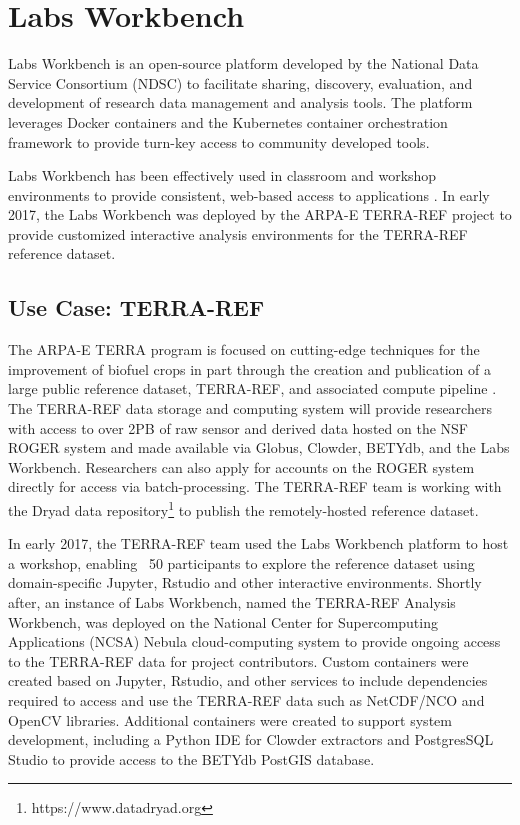 \documentclass{sig-alternate}
\begin{document}
\section{Labs Workbench}

Labs Workbench is an open-source platform developed by the National Data Service Consortium (NDSC) to facilitate sharing, discovery, evaluation, and development of research data management and analysis tools. The platform leverages Docker containers and the Kubernetes container orchestration framework to provide turn-key access to community developed tools. 

Labs Workbench has been effectively used in classroom and workshop environments to provide consistent, web-based access to applications \cite{ndsphenome}. In early 2017, the Labs Workbench was deployed by the ARPA-E TERRA-REF project to provide customized interactive analysis environments for the TERRA-REF reference dataset. 

\subsection{Use Case: TERRA-REF}

The ARPA-E TERRA program is focused on cutting-edge techniques for the improvement of biofuel crops in part through the creation and publication of a large public reference dataset, TERRA-REF, and associated compute pipeline \cite{arpae2015}. The TERRA-REF data storage and computing system will provide researchers with access to over 2PB of raw sensor and derived data hosted on the NSF ROGER system and made available via Globus, Clowder, BETYdb, and the Labs Workbench. Researchers can also apply for accounts on the ROGER system directly for access via batch-processing. The TERRA-REF team is working with the Dryad data repository\footnote{https://www.datadryad.org} to publish the remotely-hosted reference dataset.

In early 2017, the TERRA-REF team used the Labs Workbench platform to host a workshop, enabling ~50 participants to explore the reference dataset using domain-specific Jupyter, Rstudio and other interactive environments. Shortly after, an instance of Labs Workbench, named the TERRA-REF Analysis Workbench, was deployed on the National Center for Supercomputing Applications (NCSA) Nebula cloud-computing system to provide ongoing access to the TERRA-REF data for project contributors. Custom containers were created based on Jupyter, Rstudio, and other services to include dependencies required to access and use the TERRA-REF data such as NetCDF/NCO and OpenCV libraries.  Additional containers were created to support system development, including a Python IDE for Clowder extractors and PostgresSQL Studio to provide access to the BETYdb PostGIS database.
\end{document}
